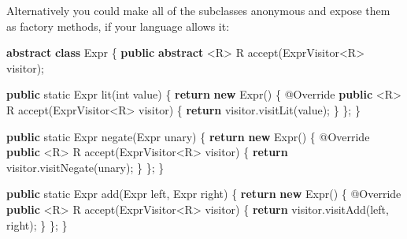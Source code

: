 \documentclass[]{article}
\newenvironment{Shaded}{}{}
\newcommand{\AttributeTok}[1]{\textcolor[rgb]{0.49,0.56,0.16}{#1}}
\newcommand{\ControlFlowTok}[1]{\textcolor[rgb]{0.00,0.44,0.13}{\textbf{#1}}}
\newcommand{\DataTypeTok}[1]{\textcolor[rgb]{0.56,0.13,0.00}{#1}}
\newcommand{\FunctionTok}[1]{\textcolor[rgb]{0.02,0.16,0.49}{#1}}
\newcommand{\KeywordTok}[1]{\textcolor[rgb]{0.00,0.44,0.13}{\textbf{#1}}}
\newcommand{\NormalTok}[1]{#1}
\newcommand{\OperatorTok}[1]{\textcolor[rgb]{0.40,0.40,0.40}{#1}}
\begin{document}
Alternatively you could make all of the subclasses anonymous and expose them as
factory methods, if your language allows it:

\begin{Shaded}
\begin{Highlighting}[]
\KeywordTok{abstract} \KeywordTok{class}\NormalTok{ Expr }\OperatorTok{\{}
    \KeywordTok{public} \KeywordTok{abstract} \OperatorTok{\textless{}}\NormalTok{R}\OperatorTok{\textgreater{}}\NormalTok{ R }\FunctionTok{accept}\OperatorTok{(}\NormalTok{ExprVisitor}\OperatorTok{\textless{}}\NormalTok{R}\OperatorTok{\textgreater{}}\NormalTok{ visitor}\OperatorTok{);}

    \KeywordTok{public} \DataTypeTok{static}\NormalTok{ Expr }\FunctionTok{lit}\OperatorTok{(}\DataTypeTok{int}\NormalTok{ value}\OperatorTok{)} \OperatorTok{\{}
        \ControlFlowTok{return} \KeywordTok{new} \FunctionTok{Expr}\OperatorTok{()} \OperatorTok{\{}
            \AttributeTok{@Override}
            \KeywordTok{public} \OperatorTok{\textless{}}\NormalTok{R}\OperatorTok{\textgreater{}}\NormalTok{ R }\FunctionTok{accept}\OperatorTok{(}\NormalTok{ExprVisitor}\OperatorTok{\textless{}}\NormalTok{R}\OperatorTok{\textgreater{}}\NormalTok{ visitor}\OperatorTok{)} \OperatorTok{\{}
                \ControlFlowTok{return}\NormalTok{ visitor}\OperatorTok{.}\FunctionTok{visitLit}\OperatorTok{(}\NormalTok{value}\OperatorTok{);}
            \OperatorTok{\}}
        \OperatorTok{\};}
    \OperatorTok{\}}

    \KeywordTok{public} \DataTypeTok{static}\NormalTok{ Expr }\FunctionTok{negate}\OperatorTok{(}\NormalTok{Expr unary}\OperatorTok{)} \OperatorTok{\{}
        \ControlFlowTok{return} \KeywordTok{new} \FunctionTok{Expr}\OperatorTok{()} \OperatorTok{\{}
            \AttributeTok{@Override}
            \KeywordTok{public} \OperatorTok{\textless{}}\NormalTok{R}\OperatorTok{\textgreater{}}\NormalTok{ R }\FunctionTok{accept}\OperatorTok{(}\NormalTok{ExprVisitor}\OperatorTok{\textless{}}\NormalTok{R}\OperatorTok{\textgreater{}}\NormalTok{ visitor}\OperatorTok{)} \OperatorTok{\{}
                \ControlFlowTok{return}\NormalTok{ visitor}\OperatorTok{.}\FunctionTok{visitNegate}\OperatorTok{(}\NormalTok{unary}\OperatorTok{);}
            \OperatorTok{\}}
        \OperatorTok{\};}
    \OperatorTok{\}}

    \KeywordTok{public} \DataTypeTok{static}\NormalTok{ Expr }\FunctionTok{add}\OperatorTok{(}\NormalTok{Expr left}\OperatorTok{,}\NormalTok{ Expr right}\OperatorTok{)} \OperatorTok{\{}
        \ControlFlowTok{return} \KeywordTok{new} \FunctionTok{Expr}\OperatorTok{()} \OperatorTok{\{}
            \AttributeTok{@Override}
            \KeywordTok{public} \OperatorTok{\textless{}}\NormalTok{R}\OperatorTok{\textgreater{}}\NormalTok{ R }\FunctionTok{accept}\OperatorTok{(}\NormalTok{ExprVisitor}\OperatorTok{\textless{}}\NormalTok{R}\OperatorTok{\textgreater{}}\NormalTok{ visitor}\OperatorTok{)} \OperatorTok{\{}
                \ControlFlowTok{return}\NormalTok{ visitor}\OperatorTok{.}\FunctionTok{visitAdd}\OperatorTok{(}\NormalTok{left}\OperatorTok{,}\NormalTok{ right}\OperatorTok{);}
            \OperatorTok{\}}
        \OperatorTok{\};}
    \OperatorTok{\}}


\end{Highlighting}
\end{Shaded}
\end{document}
